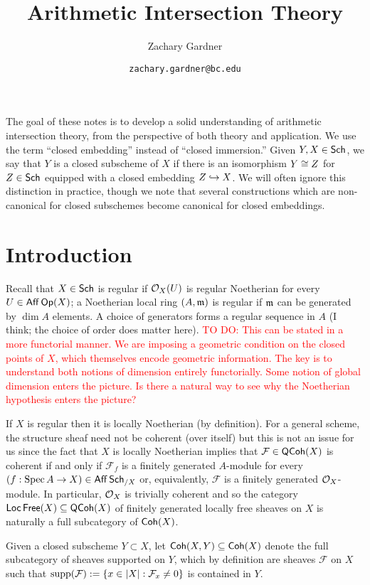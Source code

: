 \documentclass[11pt]{article}
\newcommand{\FF}{\mathcal{F}}
\begin{document}
\title{Arithmetic Intersection Theory}
\author{Zachary Gardner}
\date{\texttt{zachary.gardner@bc.edu}}
\maketitle

The goal of these notes is to develop a solid understanding of arithmetic intersection theory, from the perspective of both theory and application. We use the term ``closed embedding'' instead of ``closed immersion.'' Given $Y,X\in\operatorname{\mathsf{Sch}}$, we say that $Y$ is a closed subscheme of $X$ if there is an isomorphism $Y\cong Z$ for $Z\in\operatorname{\mathsf{Sch}}$ equipped with a closed embedding $Z\hookrightarrow X$. We will often ignore this distinction in practice, though we note that several constructions which are non-canonical for closed subschemes become canonical for closed embeddings.

\section{Introduction}
Recall that $X\in\operatorname{\mathsf{Sch}}$ is regular if $\mathcal{O}_X(U)$ is regular Noetherian for every $U\in\operatorname{\mathsf{Aff}}\operatorname{\mathsf{Op}}(X)$; a Noetherian local ring $(A,\mathfrak{m})$ is regular if $\mathfrak{m}$ can be generated by $\dim A$ elements. A choice of generators forms a regular sequence in $A$ (I think; the choice of order does matter here). \textcolor{red}{TO DO: This can be stated in a more functorial manner. We are imposing a geometric condition on the closed points of $X$, which themselves encode geometric information. The key is to understand both notions of dimension entirely functorially. Some notion of global dimension enters the picture. Is there a natural way to see why the Noetherian hypothesis enters the picture?}

If $X$ is regular then it is locally Noetherian (by definition). For a general scheme, the structure sheaf need not be coherent (over itself) but this is not an issue for us since the fact that $X$ is locally Noetherian implies that $\FF\in\QCoh(X)$ is coherent if and only if $\FF_f$ is a finitely generated $A$-module for every $(f: \operatorname{Spec} A\to X)\in\operatorname{\mathsf{Aff}}\operatorname{\mathsf{Sch}}_{/X}$ or, equivalently, $\FF$ is a finitely generated $\mathcal{O}_X$-module. In particular, $\mathcal{O}_X$ is trivially coherent and so the category $\operatorname{\mathsf{Loc}}\operatorname{\mathsf{Free}}(X)\subseteq\operatorname{\mathsf{QCoh}}(X)$ of finitely generated locally free sheaves on $X$ is naturally a full subcategory of $\operatorname{\mathsf{Coh}}(X)$. 

Given a closed subscheme $Y\subset X$, let $\operatorname{\mathsf{Coh}}(X,Y)\subseteq\operatorname{\mathsf{Coh}}(X)$ denote the full subcategory of sheaves supported on $Y$, which by definition are sheaves $\FF$ on $X$ such that $\supp(\FF):=\{x\in\abs{X} : \FF_x\neq0\}$ is contained in $Y$. 
\end{document}
